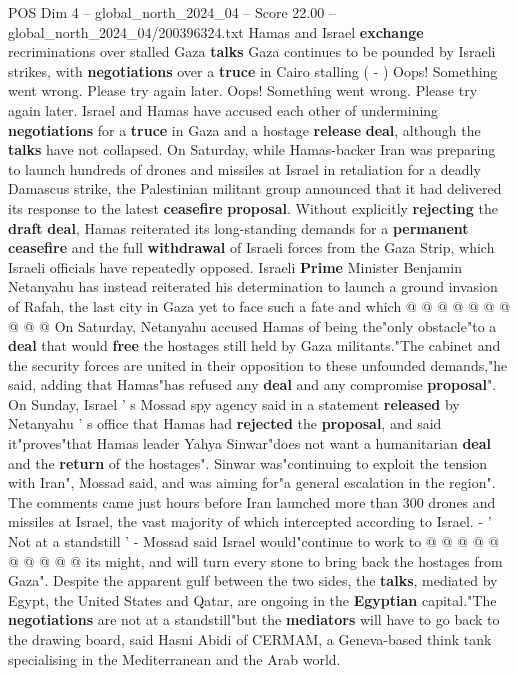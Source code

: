 \begin{textsample}{POS Dim 4 – global\_north\_2024\_04 – Score 22.00 – global\_north\_2024\_04/200396324.txt}  \label{ex:f4_pos_362}
Hamas and Israel \textbf{exchange} recriminations over stalled Gaza \textbf{talks} Gaza continues to be pounded by Israeli strikes, with \textbf{negotiations} over a \textbf{truce} in Cairo stalling ( - ) Oops!
Something went wrong.
Please try again later.
Oops!
Something went wrong.
Please try again later.
Israel and Hamas have accused each other of undermining \textbf{negotiations} for a \textbf{truce} in Gaza and a hostage \textbf{release} \textbf{deal}, although the \textbf{talks} have not collapsed.
On Saturday, while Hamas-backer Iran was preparing to launch hundreds of drones and missiles at Israel in retaliation for a deadly Damascus strike, the Palestinian militant group announced that it had delivered its response to the latest \textbf{ceasefire} \textbf{proposal}.
Without explicitly \textbf{rejecting} the \textbf{draft} \textbf{deal}, Hamas reiterated its long-standing demands for a \textbf{permanent} \textbf{ceasefire} and the full \textbf{withdrawal} of Israeli forces from the Gaza Strip, which Israeli officials have repeatedly opposed.
Israeli \textbf{Prime} Minister Benjamin Netanyahu has instead reiterated his determination to launch a ground invasion of Rafah, the last city in Gaza yet to face such a fate and which @ @ @ @ @ @ @ @ @ @ On Saturday, Netanyahu accused Hamas of being the"only obstacle"to a \textbf{deal} that would \textbf{free} the hostages still held by Gaza militants."The cabinet and the security forces are united in their opposition to these unfounded demands,"he said, adding that Hamas"has refused any \textbf{deal} and any compromise \textbf{proposal}".
On Sunday, Israel ' s Mossad spy agency said in a statement \textbf{released} by Netanyahu ' s office that Hamas had \textbf{rejected} the \textbf{proposal}, and said it"proves"that Hamas leader Yahya Sinwar"does not want a humanitarian \textbf{deal} and the \textbf{return} of the hostages".
Sinwar was"continuing to exploit the tension with Iran", Mossad said, and was aiming for"a general escalation in the region".
The comments came just hours before Iran launched more than 300 drones and missiles at Israel, the vast majority of which intercepted according to Israel. - ' Not at a standstill ' - Mossad said Israel would"continue to work to @ @ @ @ @ @ @ @ @ @ its might, and will turn every stone to bring back the hostages from Gaza".
Despite the apparent gulf between the two sides, the \textbf{talks}, mediated by Egypt, the United States and Qatar, are ongoing in the \textbf{Egyptian} capital."The \textbf{negotiations} are not at a standstill"but the \textbf{mediators} will have to go back to the drawing board, said Hasni Abidi of CERMAM, a Geneva-based think tank specialising in the Mediterranean and the Arab world.

\end{textsample}
